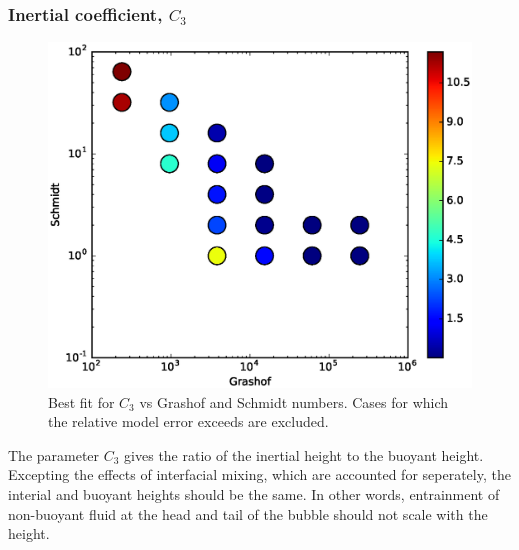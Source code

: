 \subsubsection{Inertial coefficient, $C_3$}
\begin{figure}
\includegraphics[width=\columnwidth]{figs/C3-vs-Gr-Sc}
\caption{ 
  Best fit for $C_3$ vs Grashof and Schmidt numbers.
  Cases for which the relative model error exceeds \fittol are excluded.
}
\end{figure}


The parameter $C_3$ gives the ratio of the inertial height to the buoyant height.
Excepting the effects of interfacial mixing, which are accounted for seperately, the interial and buoyant heights should be the same.
In other words, entrainment of non-buoyant fluid at the head and tail of the bubble should not scale with the height.

